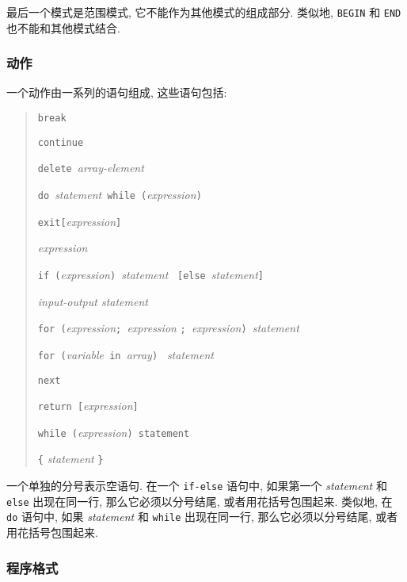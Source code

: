 最后一个模式是范围模式, 它不能作为其他模式的组成部分. 类似地,
\texttt{BEGIN} 和 \texttt{END} 也不能和其他模式结合.
\subsubsection{动作}
一个动作由一系列的语句组成, 这些语句包括:
\begin{quote}
    \texttt{break}

    \texttt{continue}

    \texttt{delete}\ \textit{array-element}

    \texttt{do}\ \textit{statement}\ \texttt{while}\
    \texttt{(}\textit{expression}\texttt{)}

    \texttt{exit[}\textit{expression}\texttt{]}

    \textit{expression}

    \texttt{if (}\textit{expression}\texttt{) }\textit{statement}
    \ \texttt{[else}\ \textit{statement}\texttt{]}

    \textit{input-output statement}

    \texttt{for (}\textit{expression}\texttt{; }\textit{expression}
    \texttt{; }\textit{expression}\texttt{) }\textit{statement}

    \texttt{for (}\textit{variable}\texttt{ in }\textit{array}\texttt{) }
    \textit{statement}

    \texttt{next}

    \texttt{return [}\textit{expression}\texttt{]}

    \texttt{while (}\textit{expression}\texttt{) statement}

    \verb'{' \textit{statement} \verb'}'
\end{quote}
一个单独的分号表示空语句. 在一个 \texttt{if-else} 语句中, 如果第一个 
\textit{statement} 和 \texttt{else} 出现在同一行, 那么它必须以分号结尾, 
或者用花括号包围起来. 类似地, 在 \texttt{do} 语句中, 如果
\textit{statement} 和 \texttt{while} 出现在同一行, 那么它必须以分号结尾,
或者用花括号包围起来.

\subsubsection{程序格式}

